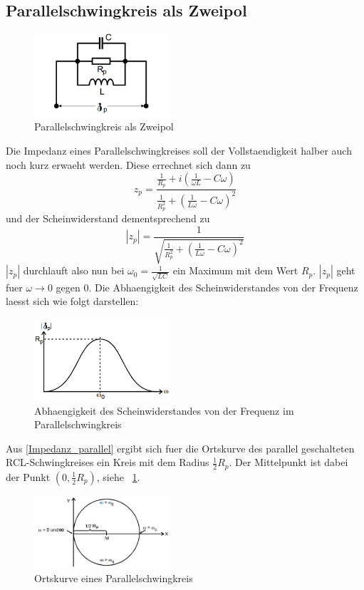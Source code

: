 \documentclass[titlepage=firstcover, captions=tableheading]{scrartcl}
\begin{document}
\subsection{Parallelschwingkreis als Zweipol}
\begin{figure}[H]
    \centering
    \includegraphics[width=0.45\textwidth]{"RCL_Parallelschwingkreis.png"}
    \caption{Parallelschwingkreis als Zweipol}
\end{figure}
\noindent Die Impedanz eines Parallelschwingkreises soll der Vollstaendigkeit halber auch noch kurz erwaeht werden. Diese errechnet sich dann zu
\begin{equation}\label{Impedanz_parallel}
    z_p=\frac{\frac{1}{R_p}+i(\frac{1}{\omega L}-C\omega)}{\frac{1}{R_p^2}+(\frac{1}{L\omega}-C\omega)^2} 
\end{equation}
und der Scheinwiderstand dementsprechend zu
\begin{equation}
    |z_p|=\frac{1}{\sqrt{\frac{1}{R_p^2}+(\frac{1}{L\omega}-C\omega)^2}}
\end{equation}
$|z_p|$ durchlauft also nun bei $\omega_0=\frac{1}{\sqrt{LC}}$ ein Maximum mit dem Wert $R_p$. $|z_p|$ geht fuer $\omega\rightarrow 0$ gegen 0. Die Abhaengigkeit des Scheinwiderstandes von der Frequenz laesst sich wie folgt darstellen:
\begin{figure}[H]
    \centering
    \includegraphics[width=0.45\textwidth]{"RCL_Parallelschwingkreis_Abhaengigkeit.png"}
    \caption{Abhaengigkeit des Scheinwiderstandes von der Frequenz im Parallelschwingkreis}
\end{figure}
Aus \ref{Impedanz_parallel} ergibt sich fuer die Ortskurve des parallel geschalteten RCL-Schwingkreises ein Kreis mit dem Radius $\frac{1}{2}R_p$. Der Mittelpunkt ist dabei der Punkt $(0,\frac{1}{2}R_p)$, siehe ~\ref{fig:Parallel_Ortskurve}.
\begin{figure}[H]
    \centering
    \includegraphics[width=0.45\textwidth]{"RCL_Parallelschwingkreis_Ortskurve.png"} 
    \caption{Ortskurve eines Parallelschwingkreis}
    \label{fig:Parallel_Ortskurve}
\end{figure}
\end{document}
